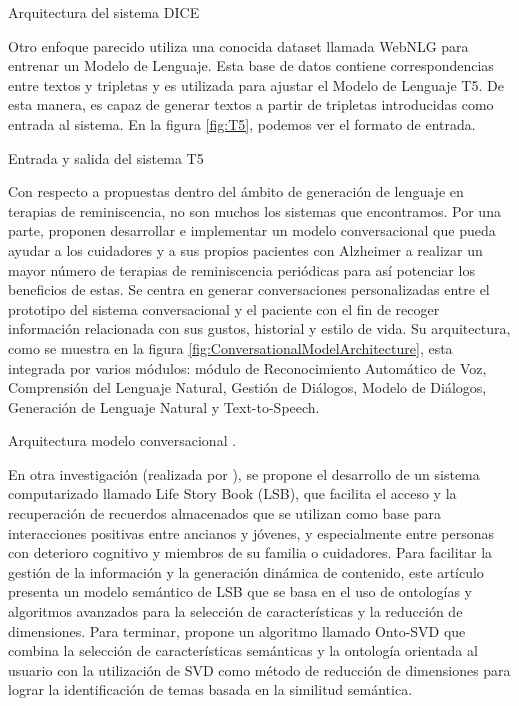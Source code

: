 %
{Arquitectura del sistema DICE}

Otro enfoque parecido utiliza una conocida dataset llamada WebNLG para entrenar un Modelo de Lenguaje. Esta base de datos contiene correspondencias entre textos y tripletas y es utilizada para ajustar el Modelo de Lenguaje T5. De esta manera, es capaz de generar textos a partir de tripletas introducidas como entrada al sistema. En la figura \ref{fig:T5}, podemos ver el formato de entrada.

%
{Entrada y salida del sistema T5}

Con respecto a propuestas dentro del ámbito de generación de lenguaje en terapias de reminiscencia, no son muchos los sistemas que encontramos. Por una parte, \citep{MoralesdeJess2020ACM} proponen desarrollar e implementar un modelo conversacional que pueda ayudar a los cuidadores y a sus propios pacientes con Alzheimer a realizar un mayor número de terapias de reminiscencia periódicas para así potenciar los beneficios de estas. Se centra en generar conversaciones personalizadas entre el prototipo del sistema conversacional y el paciente con el fin de recoger información relacionada con sus gustos, historial y estilo de vida. Su arquitectura, como se muestra en la figura \ref{fig:ConversationalModelArchitecture}, esta integrada por varios módulos: módulo de Reconocimiento Automático de Voz, Comprensión del Lenguaje Natural, Gestión de Diálogos, Modelo de Diálogos, Generación de Lenguaje Natural y Text-to-Speech.


%
{Arquitectura modelo conversacional \citep{deconversational}.}

En otra investigación (realizada por \cite{shi2012user}), se propone el desarrollo de un sistema computarizado llamado Life Story Book (LSB), que facilita el acceso y la recuperación de recuerdos almacenados que se utilizan como base para interacciones positivas entre ancianos y jóvenes, y especialmente entre personas con deterioro cognitivo y miembros de su familia o cuidadores. Para facilitar la gestión de la información y la generación dinámica de contenido, este artículo presenta un modelo semántico de LSB que se basa en el uso de ontologías y algoritmos avanzados para la selección de características y la reducción de dimensiones. Para terminar, propone un algoritmo llamado Onto-SVD que combina la selección de características semánticas y la ontología orientada al usuario con  la utilización de SVD como método de reducción de dimensiones para lograr la identificación de temas basada en la similitud semántica.


